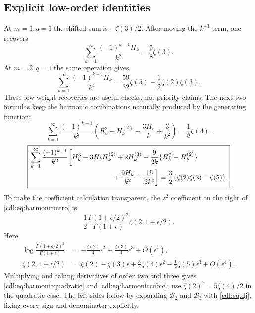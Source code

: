 \documentclass[11pt,letterpaper]{article}
\numberwithin{equation}{section}
\theoremstyle{definition}\newtheorem{definition}[theorem]{Definition}
\theoremstyle{remark}\newtheorem{remark}[theorem]{Remark}
\newcommand{\B}{\mathcal B}\newcommand{\PP}{\mathcal P}
\begin{document}
\subsection{Explicit low-order identities}
At $m=1,q=1$ the shifted sum is $-\zeta(3)/2$. After moving the
$k^{-3}$ term, one recovers
\begin{equation}\label{cdl:eq:classicharmonic}
 \sum_{k=1}^\infty\frac{(-1)^{k-1}H_k}{k^2}=\frac58\zeta(3).
\end{equation}
At $m=2,q=1$ the same operation gives
\begin{equation}\label{cdl:eq:weight5}
 \sum_{k=1}^\infty\frac{(-1)^{k-1}H_k}{k^4}
 =\frac{59}{32}\zeta(5)-\frac12\zeta(2)\zeta(3).
\end{equation}
These low-weight recoveries are useful checks, not priority claims.
The next two formulas keep the harmonic combinations naturally produced
by the generating function:
\begin{equation}\label{cdl:eq:harmonicquadratic}
 \boxed{\displaystyle
 \sum_{k=1}^\infty\frac{(-1)^{k-1}}{k^2}
 \left(H_k^2-H_k^{(2)}-\frac{3H_k}{k}+\frac3{k^2}\right)
 =\frac18\zeta(4).}
\end{equation}
\begin{equation}\label{cdl:eq:harmoniccubic}
 \boxed{\begin{aligned}
 &\sum_{k=1}^\infty\frac{(-1)^{k-1}}{k^2}
 \biggl[H_k^3-3H_kH_k^{(2)}+2H_k^{(3)}
 -\frac9{2k}\{H_k^2-H_k^{(2)}\}\\[-2pt]
 &\hspace{42mm}+\frac{9H_k}{k^2}-\frac{15}{2k^3}\biggr]
 =\frac32\{\zeta(2)\zeta(3)-\zeta(5)\}.
 \end{aligned}}
\end{equation}
To make the coefficient calculation transparent, the $z^2$ coefficient
on the right of \eqref{cdl:eq:harmonicintro} is
\begin{equation}\label{cdl:eq:z2master}
 \frac12\frac{\Gamma(1+\epsilon/2)^2}{\Gamma(1+\epsilon)}
 \zeta(2,1+\epsilon/2).
\end{equation}
Here
\begin{align*}
 \log\frac{\Gamma(1+\epsilon/2)^2}{\Gamma(1+\epsilon)}
 &=-\frac{\zeta(2)}4\epsilon^2+
    \frac{\zeta(3)}4\epsilon^3+O(\epsilon^4),\\
 \zeta(2,1+\epsilon/2)
 &=\zeta(2)-\zeta(3)\epsilon+
   \frac34\zeta(4)\epsilon^2-\frac12\zeta(5)\epsilon^3+O(\epsilon^4).
\end{align*}
Multiplying and taking derivatives of order two and three gives
\eqref{cdl:eq:harmonicquadratic} and \eqref{cdl:eq:harmoniccubic};
use $\zeta(2)^2=5\zeta(4)/2$ in the quadratic case.
The left sides follow by expanding $\B_2$ and $\B_3$ with
\eqref{cdl:eq:dj}, fixing every sign and denominator explicitly.
\end{document}
